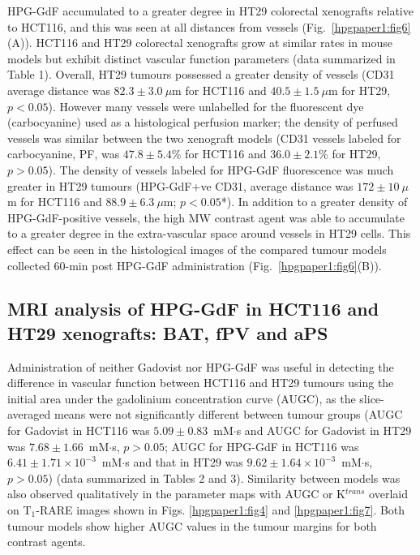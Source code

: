HPG-GdF accumulated to a greater degree in HT29 colorectal xenografts relative to HCT116, and this was seen at all distances from vessels (Fig.~\ref{hpgpaper1:fig6}(A)).
HCT116 and HT29 colorectal xenografts grow at similar rates in mouse models but exhibit distinct vascular function parameters (data summarized in Table 1).
Overall, HT29 tumours possessed a greater density of vessels (\acs{CD31} average distance was $82.3\pm 3.0~\mu$m for HCT116 and $40.5\pm 1.5~\mu$m for HT29, $p<0.05$).
However many vessels were unlabelled for the fluorescent dye (carbocyanine) used as a histological perfusion marker; the density of perfused vessels was similar between the two xenograft models (\acs{CD31} vessels labeled for carbocyanine, PF, was $47.8\pm 5.4$\% for HCT116 and $36.0\pm 2.1$\% for HT29, $p>0.05$).
The density of vessels labeled for \acs{HPG-GdF} fluorescence was much greater in HT29 tumours (HPG-GdF+ve \acs{CD31}, average distance was $172\pm 10~\mu$m for HCT116 and $88.9\pm 6.3~\mu$m; $p < 0.05$*).
In addition to a greater density of \acs{HPG-GdF}-positive vessels, the high \acs{MW} contrast agent was able to accumulate to a greater degree in the extra-vascular space around vessels in HT29 cells.
This effect can be seen in the histological images of the compared tumour models collected 60-min post \acs{HPG-GdF} administration (Fig.~\ref{hpgpaper1:fig6}(B)).

\subsection{MRI analysis of \acs{HPG-GdF} in HCT116 and HT29 xenografts: \acs{BAT}, \acs{fPV} and aPS}

Administration of neither Gadovist nor \acs{HPG-GdF} was useful in detecting the difference in vascular function between HCT116 and HT29 tumours using the initial area under the gadolinium concentration curve (AUGC), as the slice-averaged means were not significantly different between tumour groups (AUGC for Gadovist in HCT116 was $5.09\pm 0.83$~mM$\cdot$s and AUGC for Gadovist in HT29 was $7.68\pm 1.66$~mM$\cdot$s, ${p>0.05}$; AUGC for \acs{HPG-GdF} in HCT116 was $6.41\pm 1.71\times 10^{-3}$~mM$\cdot$s and that in HT29 was $9.62\pm 1.64\times 10^{-3}$~mM$\cdot$s, ${p>0.05}$) (data summarized in Tables 2 and 3).
Similarity between models was also observed qualitatively in the parameter maps with AUGC or K$^{trans}$ overlaid on T$_1$-RARE images shown in Figs.
\ref{hpgpaper1:fig4} and \ref{hpgpaper1:fig7}.
Both tumour models show higher AUGC values in the tumour margins for both contrast agents.

